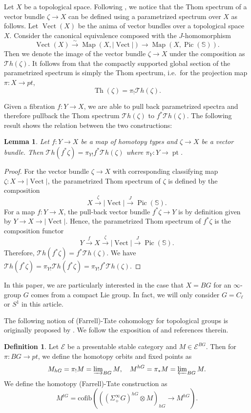 \documentclass[11pt]{amsart}
\numberwithin{equation}{section}
\theoremstyle{plain}
\newtheorem{Lemma}[lemma]{Lemma}
\theoremstyle{definition}
\newtheorem{Def}[def]{Definition}
\theoremstyle{remark}
\newcommand{\cE} { {\mathcal{E}}}
\newcommand{\pt}{{\operatorname{pt}}}
\newcommand{\Thom}{\operatorname{Th}}
\newcommand{\Thompr}{\mathcal{T}\mathit{h}}
\newcommand{\Map}{{\operatorname{Map}}}
\newcommand\Pic{ \operatorname{Pic}  }
\newcommand\Vect{\operatorname{Vect}}
\begin{document}
Let $X$ be a topological space. Following \cite[Section 2.6]{AndoBlumbergGepnerHopkinsRezk}, we notice that the Thom spectrum of a vector bundle $\zeta \to X$ can be defined using a parametrized spectrum over $X$ as follows. Let $\operatorname{Vect}(X)$ be the anima of vector bundles over a topological space $X$. Consider the canonical equivalence \cite[Theorem 7.1.0.1]{HTT} composed with the $J$-homomorphism
\[\operatorname{Vect}(X) \xrightarrow{\sim} \Map(X, |\Vect|) \to \Map(X, \Pic(\mathbb{S})).\]
Then we denote the image of the vector bundle $\zeta \to X$ under the composition as $\Thompr(\zeta)$. It follows from \cite[Definition 2.20]{AndoBlumbergGepnerHopkinsRezk} that the compactly supported global section of the parametrized spectrum is simply the Thom spectrum, i.e.~for the projection map $\pi: X \to pt$,
\[\Thom(\zeta) = \pi_!\Thompr(\zeta).\]


Given a fibration $f: Y \to X$, we are able to pull back parametrized spectra and therefore pullback the Thom spectrum $\Thompr(\zeta)$ to $f^*\Thompr(\zeta)$. The following result shows the relation between the two constructions:

\begin{Lemma}\label{lem:thom-pull-back}
Let $f: Y \to X$ be a map of homotopy types and $\zeta \to X$ be a vector bundle.
Then $\Thompr(f^*\zeta) = \pi_{Y!}f^*\Thompr(\zeta)$ where $\pi_Y:Y\to \pt$.
\end{Lemma}
\begin{proof}
For the vector bundle $\zeta \to X$ with corresponding classifying map $\zeta: X \to |\Vect|$, the parametrized Thom spectrum of $\zeta$ is defined by the composition
\[X \xrightarrow{\zeta} |\Vect| \xrightarrow{J} \Pic(\mathbb{S}).\]
For a map $f: Y \to X$, the pull-back vector bundle $f^*\zeta \to Y$ is by definition given by $Y \to X \to |\Vect|$. Hence, the parametrized Thom spectrum of $f^*\zeta$ is the composition functor
\[Y \xrightarrow{f} X \xrightarrow{\zeta} |\Vect| \xrightarrow{J} \Pic(\mathbb{S}).\]
Therefore, $\Thompr(f^*\zeta) = f^*\Thompr(\zeta)$.
We have $\Thompr(f^*\zeta) = \pi_{Y!}\Thompr(f^*\zeta) = \pi_{Y!}f^*\Thompr(\zeta)$.
\end{proof}

In this paper, we are particularly interested in the case that $X = BG$ for an $\infty$-group $G$ comes from a compact Lie group. In fact, we will only consider $G = C_\ell$ or $S^1$ in this article. 

The following notion of (Farrell)-Tate cohomology for topological groups is originally proposed by \cite{Klein_2001}. We follow the exposition of \cite[Section I.4]{Nikolaus-Scholze-Ontopologicalcyclichomology} and references therein.
\begin{Def}
Let $\cE$ be a presentable stable category and $M \in \cE^{BG}$. Then for $\pi: BG \to pt$, we define the homotopy orbits and fixed points as
\[M_{hG} = \pi_!M = \varinjlim\nolimits_{BG}M, \quad M^{hG} = \pi_*M = \varprojlim\nolimits_{BG}M.\]
We define the homotopy (Farrell)-Tate construction as
\[M^{tG} = \mathrm{cofib}(((\Sigma_+^\infty G)^{hG}\otimes M)_{hG} \to M^{hG}) .\]
\end{Def}
\end{document}
